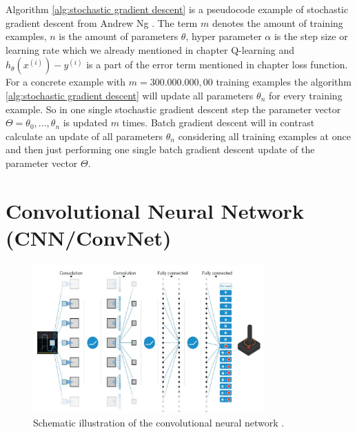 \documentclass[conference]{IEEEtran}
\begin{document}
Algorithm \ref{alg:stochastic gradient descent} is a pseudocode example of stochastic gradient descent from Andrew Ng \cite{ng_2017}. The term $m$ denotes the amount of training examples, $n$ is the amount of parameters $\theta$, hyper parameter $\alpha$ is the step size or learning rate which we already mentioned in chapter Q-learning and $h_\theta(x^{(i)}) - y^{(i)}$ is a part of the error term mentioned in chapter loss function. For a concrete example with $m = 300.000.000,00$ training examples the algorithm \ref{alg:stochastic gradient descent} will update all parameters $\theta_n$ for every training example. So in one single stochastic gradient descent step the parameter vector $\Theta = \theta_0, ..., \theta_n$ is updated $m$ times. Batch gradient descent will in contrast calculate an update of all parameters $\theta_n$ considering all training examples at once and then just performing one single batch gradient descent update of the parameter vector $\Theta$.

\section{Convolutional Neural Network (CNN/ConvNet)}

\begin{figure}[!t]
\centering
\includegraphics[width=3.5in]{conv_net}
\caption{Schematic illustration of the convolutional neural network \cite{DRL:HumanLevelControl}.}
\label{fig:conv_net}
\end{figure}
\end{document}
